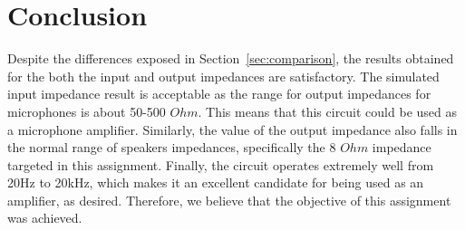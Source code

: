 \section{Conclusion}
\label{sec:conclusion}


Despite the differences exposed in Section~\ref{sec:comparison}, the results obtained for the both the input and output impedances are satisfactory. The simulated input impedance result is acceptable as the range for output impedances for microphones is about 50-500 $Ohm$. This means that this circuit could be used as a microphone amplifier.
Similarly, the value of the output impedance also falls in the normal range of speakers impedances, specifically the 8 $Ohm$ impedance targeted in this assignment.
Finally, the circuit operates extremely well from 20Hz to 20kHz, which makes it an excellent candidate for being used as an amplifier, as desired.
Therefore, we believe that the objective of this assignment was achieved.

